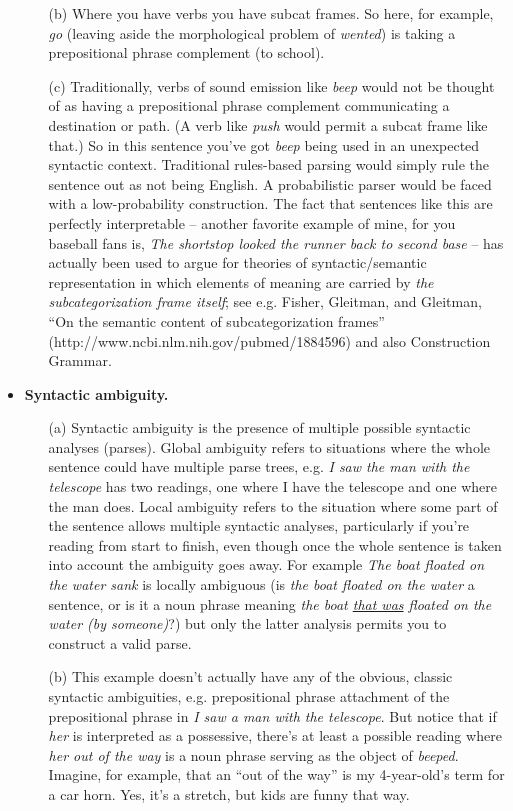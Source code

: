 \documentclass[11pt]{article}
\begin{document}
\begin{itemize}
\begin{itemize}
\item[(b)] Where you have verbs you have subcat frames.  So here, for example, \emph{go} (leaving aside the morphological problem of \emph{wented}) is taking a prepositional phrase complement (to school).
\item[(c)] Traditionally, verbs of sound emission like \emph{beep} would not be thought of as having a prepositional phrase complement communicating a destination or path.  (A verb like \emph{push} would permit a subcat frame like that.)  So in this sentence you've got \emph{beep} being used in an unexpected syntactic context.  Traditional rules-based parsing would simply rule the sentence out as not being English.  A probabilistic parser would be faced with a low-probability construction.  The fact that sentences like this are perfectly interpretable -- another favorite example of mine, for you baseball fans is, \emph{The shortstop looked the runner back to second base} -- has actually been used to argue for theories of syntactic/semantic representation in which elements of meaning are carried by \emph{the subcategorization frame itself}; see e.g. Fisher, Gleitman, and Gleitman, ``On the semantic content of subcategorization frames'' (http://www.ncbi.nlm.nih.gov/pubmed/1884596) and also Construction Grammar.
\end{itemize}
\item {\bf Syntactic ambiguity.}
\begin{itemize}
\item[(a)] Syntactic ambiguity is the presence of  multiple possible syntactic analyses (parses).  Global ambiguity refers to situations where the whole sentence could have multiple parse trees, e.g. \emph{I saw the man with the telescope} has two readings, one where I have the telescope and one where the man does.  Local ambiguity refers to the situation where some part of the sentence allows multiple syntactic analyses, particularly if you're reading from start to finish, even though once the whole sentence is taken into account the ambiguity goes away.  For example \emph{The boat floated on the water sank} is locally ambiguous (is \emph{the boat floated on the water} a sentence, or is it a noun phrase meaning \emph{the boat \underline{that was} floated on the water (by someone)}?) but only the latter analysis permits you to construct a valid parse. 
\item[(b)] This example doesn't actually have any of the obvious, classic syntactic ambiguities, e.g. prepositional phrase attachment of the prepositional phrase in \emph{I saw a man with the telescope}.  But notice that if \emph{her} is interpreted as a possessive, there's at least a possible reading where \emph{her out of the way} is a noun phrase serving as the object of \emph{beeped}.  Imagine, for example, that an ``out of the way'' is my 4-year-old's term for a car horn.  Yes, it's a stretch, but kids are funny that way.

\end{itemize}
\end{itemize}
\end{document}

